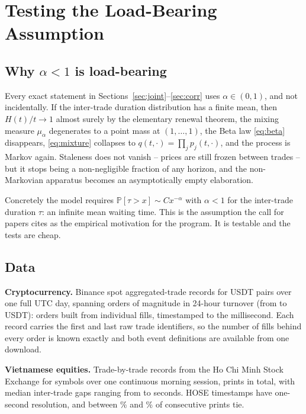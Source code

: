 \documentclass{ws-ijtaf}
\newcommand{\PP}{\mathbb{P}}
\begin{document}
\section{Testing the Load-Bearing Assumption}\label{sec:empirics}

\subsection{Why $\alpha<1$ is load-bearing}

Every exact statement in Sections~\ref{sec:joint}--\ref{sec:corr} uses
$\alpha\in(0,1)$, and not incidentally. If the inter-trade duration distribution
has a finite mean, then $H(t)/t\to1$ almost surely by the elementary renewal
theorem, the mixing measure $\mu_\alpha$ degenerates to a point mass at
$(1,\dots,1)$, the Beta law \eqref{eq:beta} disappears, \eqref{eq:mixture}
collapses to $q(t,\cdot)=\prod_j p_j(t,\cdot)$, and the process is Markov again.
Staleness does not vanish -- prices are still frozen between trades -- but it
stops being a non-negligible fraction of any horizon, and the non-Markovian
apparatus becomes an asymptotically empty elaboration.

Concretely the model requires $\PP[\tau>x]\sim Cx^{-\alpha}$ with $\alpha<1$ for
the inter-trade duration $\tau$: an infinite mean waiting time. This is the
assumption the call for papers cites as the empirical motivation for the
program. It is testable and the tests are cheap.

\subsection{Data}

\begin{itemlist}
\item \textbf{Cryptocurrency.} Binance spot aggregated-trade records for
\cryptoNsym{} USDT pairs over one full UTC day, spanning \cryptoVolDecades{}
orders of magnitude in 24-hour turnover (from \cryptoVolLo{} to \cryptoVolHi{}
USDT): \cryptoTotalOrders{} orders built from \cryptoTotalFills{} individual
fills, timestamped to the millisecond. Each record carries the first and last
raw trade identifiers, so the number of fills behind every order is known
exactly and both event definitions are available from one download.

\item \textbf{Vietnamese equities.} Trade-by-trade records from the Ho Chi Minh
Stock Exchange for \hoseNsym{} symbols over one continuous morning session,
\hoseTotalTicks{} prints in total, with median inter-trade gaps ranging from
\hoseGapLo{} to \hoseGapHi{} seconds. HOSE timestamps have one-second
resolution, and between \hoseTieLo{}\% and \hoseTieHi{}\% of consecutive prints
tie.
\end{itemlist}
\end{document}

